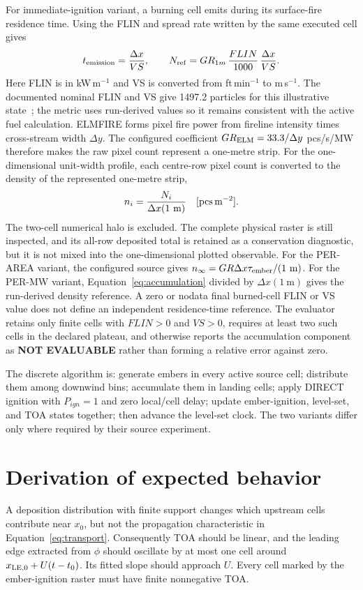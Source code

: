 For immediate-ignition variant, a burning cell emits during its surface-fire residence time. Using
the FLIN and spread rate written by the same executed cell gives
\begin{equation}
 t_{\rm emission}=\frac{\Delta x}{VS},\qquad
 N_{\rm ref}=GR_{1m}\,\frac{FLIN}{1000}\,\frac{\Delta x}{VS}.
 \label{eq:accumulation}
\end{equation}
Here FLIN is in kW\,m$^{-1}$ and VS is converted from ft\,min$^{-1}$ to
m\,s$^{-1}$. The documented nominal FLIN and VS give 1497.2 particles
for this illustrative state~\cite{Qin2025}; the metric uses run-derived values
so it remains consistent with the active fuel calculation.
ELMFIRE forms pixel fire power from fireline intensity times cross-stream width
$\Delta y$. The configured coefficient $GR_{\rm ELM}=33.3/\Delta y$
pcs/s/MW therefore makes the raw pixel count represent a one-metre strip.
For the one-dimensional unit-width profile, each centre-row pixel count is
converted to the density of the represented one-metre strip,
\begin{equation}
n_i=\frac{N_i}{\Delta x(1\ {\rm m})}\quad[\mathrm{pcs\,m^{-2}}].
\label{eq:density}
\end{equation}
The two-cell numerical halo is excluded. The complete physical raster is still
inspected, and its all-row deposited total is retained as a conservation
diagnostic, but it is not mixed into the one-dimensional plotted observable.
For the PER-AREA variant, the configured source gives
$n_\infty=GR\Delta x\tau_{\rm ember}/(1~\mathrm{m})$. For the PER-MW
variant, Equation~\ref{eq:accumulation} divided by
$\Delta x(1~\mathrm{m})$ gives the run-derived density reference. A zero or
nodata final burned-cell FLIN or VS value does not define an independent
residence-time reference. The evaluator retains only finite cells with
$FLIN>0$ and $VS>0$, requires at least two such cells in the declared plateau,
and otherwise reports the accumulation component as \textbf{NOT EVALUABLE}
rather than forming a relative error against zero.

The discrete algorithm is: generate embers in every active source cell; distribute
them among downwind bins; accumulate them in landing cells; apply DIRECT ignition
with $P_{ign}=1$ and zero local/cell delay; update ember-ignition, level-set, and
TOA states together; then advance the level-set clock. The two variants differ
only where required by their source experiment.

\section{Derivation of expected behavior}
A deposition distribution with finite support changes which upstream cells
contribute near $x_0$, but not the propagation characteristic in
Equation~\ref{eq:transport}. Consequently TOA should be linear, and the leading
edge extracted from $\phi$ should oscillate by at most one cell around
$x_{\rm LE,0}+U(t-t_0)$. Its fitted slope should approach $U$. Every cell marked by the
ember-ignition raster must have finite nonnegative TOA.

